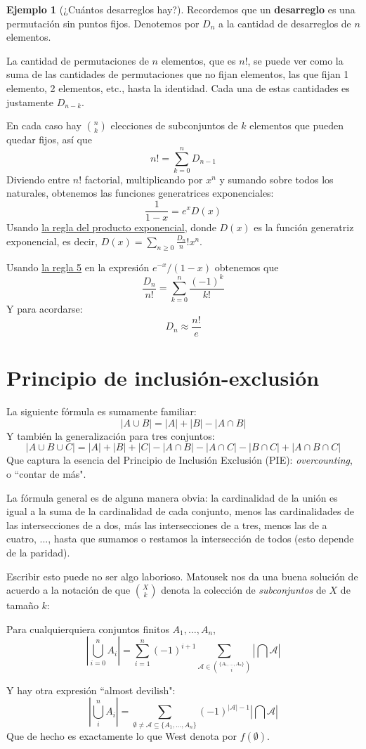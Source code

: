 \documentclass[spanish]{book}
\theoremstyle{definition}
\newtheorem*{ejem}{Ejemplo}
\begin{document}
\begin{ejem}[¿Cuántos desarreglos hay?]
	Recordemos que un \textbf{desarreglo} es una permutación sin puntos fijos. Denotemos por $D_n$ a la cantidad de desarreglos de $n$ elementos.
	
	La cantidad de permutaciones de $n$ elementos, que es $n!$, se puede ver como la suma de las cantidades de permutaciones que no fijan elementos, las que fijan 1 elemento, 2 elementos, etc., hasta la identidad. Cada una de estas cantidades es justamente $D_{n-k}$.
	
	En cada caso hay ${n\choose k}$ elecciones de subconjuntos de $k$ elementos que pueden quedar fijos, así que
	\[n!=\sum_{k=0}^nD_{n-1}\]
	Diviendo entre $n!$ factorial, multiplicando por $x^n$ y sumando sobre todos los naturales, obtenemos las funciones generatrices exponenciales:
	\[\frac{1}{1-x}=e^xD(x)\]
	Usando \hyperref[rule3p]{la regla del producto exponencial}, donde $D(x)$ es la función generatriz exponencial, es decir, $D(x)=\sum_{n\geq0}\frac{D_n}n!x^n$.
	
	Usando \hyperref[rule5]{la regla 5} en la expresión $e^{-x}/(1-x)$ obtenemos que
	\[\frac{D_n}{n!}=\sum_{k=0}^n\frac{(-1)^k}{k!}\]
	Y para acordarse:
	\[D_n\approx \frac{n!}{e}\]
\end{ejem}

\chapter{Principio de inclusión-exclusión}
La siguiente fórmula es sumamente familiar:
\[|A\cup B|=|A|+|B|-|A\cap B|\]
Y también la generalización para tres conjuntos:
\[|A\cup B\cup C|=|A|+|B|+|C|-|A\cap B|-|A\cap C|-|B\cap C|+|A\cap B\cap C|\]
Que captura la esencia del Principio de Inclusión Exclusión (PIE): \textit{overcounting}, o ``contar de más".

La fórmula general es de alguna manera obvia: la cardinalidad de la unión es igual a la suma de la cardinalidad de cada conjunto, menos las cardinalidades de las intersecciones de a dos, más las intersecciones de a tres, menos las de a cuatro, ..., hasta que sumamos o restamos la intersección de todos (esto depende de la paridad).

Escribir esto puede no ser algo laborioso. Matousek nos da una buena solución de acuerdo a la notación de que ${X\choose k}$ denota la colección de \textit{subconjuntos} de $X$ de tamaño $k$:
\begin{teo}
	Para cualquierquiera conjuntos finitos $A_1,\ldots,A_n$,
	\[\left|\bigcup_{i=0}^nA_i\right|=\sum_{i=1}^n(-1)^{i+1}\sum_{\mathcal{A}\in{\{A_1,\ldots,A_n\}\choose i}}\left|\bigcap \mathcal{A}\right|\]
\end{teo}
Y hay otra expresión ``almost devilish":
\[\left|\bigcup_i^nA_i\right|=\sum_{\emptyset\neq\mathcal{A}\subseteq \{A_1,\ldots,A_n\}}(-1)^{|\mathcal{A}|-1}\left|\bigcap\mathcal{A}\right|\]
Que de hecho es exactamente lo que West denota por $f(\emptyset)$.
\end{document}
